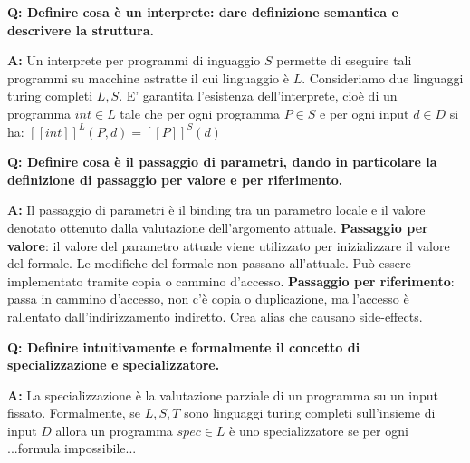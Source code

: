 \documentclass[a4paper]{article}
\newenvironment{qanda}{\setlength{\parindent}{0pt}}{\bigskip}
\newcommand{\Q}{\bigskip\bfseries Q: }
\newcommand{\A}{\par\textbf{A:} \normalfont}
\begin{document}
\begin{qanda}
	\Q Definire cosa è un interprete: dare definizione semantica e descrivere la struttura.
	
	\A Un interprete per programmi di inguaggio $S$ permette di eseguire tali programmi su macchine astratte il cui linguaggio è $L$.
	Consideriamo due linguaggi turing completi $L,S$. E' garantita l'esistenza dell'interprete, cioè di un programma $int \in L$ tale che per ogni programma 
	$P \in S$ e per ogni input $d \in D$ si ha: $[[int]]^L(P,d) = [[P]]^S(d)$
	\newline
    \newline
    
\end{qanda}
\begin{qanda}
	\Q Definire cosa è il passaggio di parametri, dando in particolare la definizione di passaggio per valore e per riferimento.
	
	\A Il passaggio di parametri è il binding tra un parametro locale e il valore denotato ottenuto dalla valutazione dell'argomento attuale.
	\textbf{Passaggio per valore}: il valore del parametro attuale viene utilizzato per inizializzare il valore del formale. Le modifiche del formale non passano all'attuale.
	Può essere implementato tramite copia o cammino d'accesso.
	\textbf{Passaggio per riferimento}: passa in cammino d'accesso, non c'è copia o duplicazione, ma l'accesso è rallentato dall'indirizzamento indiretto. Crea alias che causano side-effects.
	\newline
    \newline
    
\end{qanda}
\begin{qanda}
	\Q Definire intuitivamente e formalmente il concetto di specializzazione e specializzatore.
	    
	\A La specializzazione è la valutazione parziale di un programma su un input fissato. Formalmente, se $L,S,T$ sono linguaggi turing completi sull'insieme di input $D$
	allora un programma $spec \in L$ è uno specializzatore se per ogni ...formula impossibile...
	\newline
    \newline
    
\end{qanda}
\end{document}
